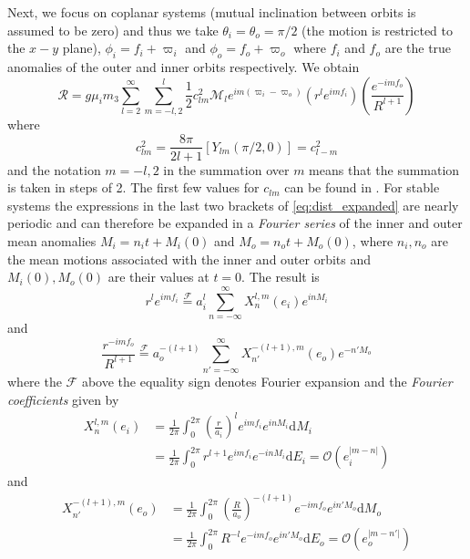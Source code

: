 \documentclass[ twoside,openright,titlepage,numbers=noenddot,headinclude,%
                footinclude=true,cleardoublepage=empty,abstractoff, %
                BCOR=5mm,paper=a4,fontsize=11pt,%
                american,%
                ]{scrreprt}
\begin{document}
Next, we focus on coplanar systems
(mutual inclination between orbits is assumed to be zero) and thus we take
$\theta_i=\theta_o=\pi/2$ (the motion is restricted to the $x-y$ plane), 
$\phi_i=f_i+\varpi_i$ and $\phi_o=f_o+\varpi_o$ where $f_i$ and $f_o$ are
the true anomalies of the outer and inner orbits respectively. We obtain 
\begin{equation}
    \mathcal{R}=g\mu_im_3\sum^\infty_{l=2}\sum^l_{m=-l,2} \frac{1}{2} c_{lm}^2\mathcal{M}_l
    e^{im(\varpi_i-\varpi_o)}\left(r^le^{imf_i}\right)\left( \frac{e^{-imf_o}}{R^{l+1}} 
    \right)
    \label{eq:dist_expanded}
\end{equation}
where
\begin{equation}
    c^2_{lm}= \frac{8\pi}{2l+1} \left[Y_{lm}(\pi/2,0)\right]=c^2_{l-m}
\end{equation}
and the notation $m=-l, 2$ in the summation over $m$ means that the summation is taken
in steps of 2. The first few values for $c_{lm}$ can be found in \cite{Mardling2013}.
For stable systems the expressions in the last two brackets of
\cref{eq:dist_expanded} are nearly periodic and can therefore be expanded in a 
\emph{Fourier series} of the inner and outer mean anomalies $M_i=n_it+M_i(0)$ and
$M_o=n_ot+M_o(0)$, where $n_i,n_o$ are the mean motions associated with the inner
and outer orbits and $M_i(0),M_o(0)$ are their values at $t=0$.  The result is
\begin{equation}
    r^le^{imf_i}\stackrel{\mathcal{F}}{=}a_i^l\sum^\infty_{n=-\infty}X^{l,m}_n(e_i)e^{inM_i}
    \label{eq:expansion_1}
\end{equation}
and
\begin{equation}
    \frac{r^{-imf_o}}{R^{l+1}} \stackrel{\mathcal{F}}{=}a_o^{-(l+1)}\sum^\infty_{n'=-\infty}
    X^{-(l+1),m}_{n'}(e_o)e^{-n'M_o}
    \label{eq:expansion_2}
\end{equation}
where the $\mathcal{F}$ above the equality sign denotes Fourier expansion 
and the \emph{Fourier coefficients} given by
\begin{equation}
    \begin{aligned}
        X^{l,m}_n(e_i)&= \frac{1}{2\pi} \int^{2\pi}_0 \left(\frac{r}{a_i}\right)^l
        e^{imf_i}e^{inM_i}\mathrm{d}M_i\\[4pt]
        &=\frac{1}{2\pi}\int^{2\pi}_0r^{l+1} e^{imf_i}e^{-inM_i}\mathrm{d}E_i
=    \mathcal{O}(e_i^{\lvert m-n\rvert})
    \label{eq:hansen_inner}
    \end{aligned}
\end{equation}
and
\begin{equation}
    \begin{aligned}
        X^{-(l+1),m}_{n'}(e_o)&= \frac{1}{2\pi} \int^{2\pi}_0 \left( \frac{R}{a_o}
        \right)^{-(l+1)}e^{-imf_o}e^{in'M_o}\mathrm{d}M_o\\[4pt]
        &=\frac{1}{2\pi}\int^{2\pi}_0R^{-l} e^{-imf_o}e^{in'M_o}\mathrm{d}E_o
        =\mathcal{O}(e_o^{\lvert m-n'\rvert})
    \end{aligned}
    \label{eq:hansen_outer}
\end{equation}
\end{document}
